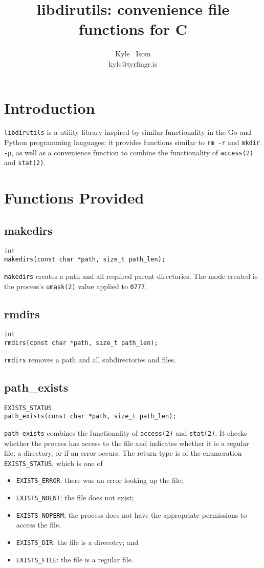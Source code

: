 \documentclass[10pt,letterpaper]{article}
\title{libdirutils: convenience file functions for C}\author{Kyle ~Isom\\kyle@tyrfingr.is}
\begin{document}
\maketitle
\section*{Introduction}
\verb|libdirutils| is a utility library inspired by similar functionality
in the Go and Python programming languages; it provides functions similar
to \verb|rm -r| and \verb|mkdir -p|, as well as a convenience function to
combine the functionality of \verb|access(2)| and \verb|stat(2)|.

\section*{Functions Provided}
\subsection*{makedirs}
\begin{verbatim}
int
makedirs(const char *path, size_t path_len);
\end{verbatim}
\verb|makedirs| creates a path and all required parent directories. The mode
created is the process's \verb|umask(2)| value applied to \verb|0777|.

\subsection*{rmdirs}
\begin{verbatim}
int
rmdirs(const char *path, size_t path_len);
\end{verbatim}
\verb|rmdirs| removes a path and all subdirectories and files.

\subsection*{path\_exists}
\begin{verbatim}
EXISTS_STATUS
path_exists(const char *path, size_t path_len);
\end{verbatim}
\verb|path_exists| combines the functionality of \verb|access(2)| and
\verb|stat(2)|. It checks whether the process has access to the file
and indicates whether it is a regular file, a directory, or if an
error occurs. The return type is of the enumeration \verb|EXISTS_STATUS|,
which is one of
\\
\begin{itemize}
  \item \verb|EXISTS_ERROR|: there was an error looking up the file;
  \item \verb|EXISTS_NOENT|: the file does not exist;
  \item \verb|EXISTS_NOPERM|: the process does not have the appropriate
  permissions to access the file.
  \item \verb|EXISTS_DIR|: the file is a direcotry; and
  \item \verb|EXISTS_FILE|: the file is a regular file.
\end{itemize}
\end{document}
